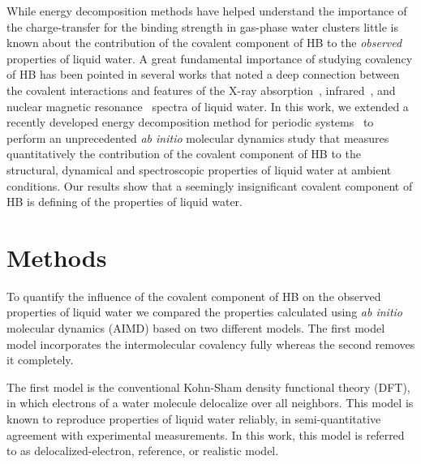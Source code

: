 \documentclass[prl,twocolumn,showpacs]{revtex4}
\begin{document}
While energy decomposition methods have helped understand the importance of the charge-transfer for the binding strength in gas-phase water clusters little is known about the contribution of the covalent component of HB to the \emph{observed} properties of liquid water. A great fundamental importance of studying covalency of HB has been pointed in several works that  noted a deep connection between the covalent interactions and features of the X-ray absorption~\cite{NatureComm2013}, infrared~\cite{JPCL2013}, and nuclear magnetic resonance~\cite{NatureComm2015} spectra of liquid water. In this work, we extended a recently developed energy decomposition method for periodic systems~\cite{Khaliullin2013JCTC} to perform an unprecedented \emph{ab initio} molecular dynamics study that measures quantitatively the contribution of the covalent component of HB to the structural, dynamical and spectroscopic properties of liquid water at ambient conditions. Our results show that a seemingly insignificant covalent component of HB is defining of the properties of liquid water. %


\section{Methods}

To quantify the influence of the covalent component of HB on the observed properties of liquid water we compared the properties calculated using \emph{ab initio} molecular dynamics (AIMD) based on two different models. The first model model incorporates the intermolecular covalency fully whereas the second removes it completely.

The first model is the conventional Kohn-Sham density functional theory (DFT), in which electrons of a water molecule delocalize over all neighbors. This model is known to reproduce properties of liquid water reliably, in semi-quantitative agreement with experimental measurements. 
In this work, this model is referred to as delocalized-electron, reference, or realistic model. %
\end{document}
